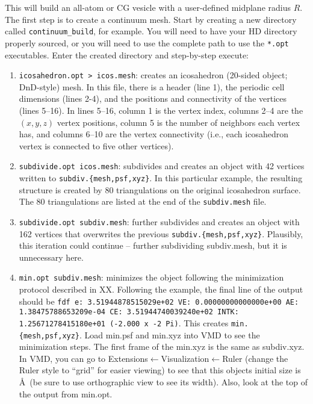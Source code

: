 This will build an all-atom or CG vesicle with a user-defined midplane radius $R$.
The first step is to create a continuum mesh.
Start by creating a new directory called \texttt{continuum_build}, for example.
You will need to have your HD directory properly sourced, or you will need to use the complete path to use the \texttt{*.opt} executables.
Enter the created directory and step-by-step execute:
\begin{enumerate}
   \item \texttt{icosahedron.opt > icos.mesh}: creates an icosahedron (20-sided object; DnD-style) mesh.
   In this file, there is a header (line 1), the periodic cell dimensions (lines 2-4), and the positions and connectivity of the vertices (lines 5--16).
   In lines 5--16, column 1 is the vertex index, columns 2--4 are the $(x,y,z)$ vertex positions, column 5 is the number of neighbors each vertex has, and columns 6--10 are the vertex connectivity (i.e., each icosahedron vertex is connected to five other vertices).
   \item \texttt{subdivide.opt icos.mesh}: subdivides and creates an object with 42 vertices written to \texttt{subdiv.\{mesh,psf,xyz\}}.
   In this particular example, the resulting structure is created by 80 triangulations on the original icosahedron surface.
   The 80 triangulations are listed at the end of the \texttt{subdiv.mesh} file.
   \item \texttt{subdivide.opt subdiv.mesh}: further subdivides and creates an object with 162 vertices that overwrites the previous \texttt{subdiv.\{mesh,psf,xyz\}}.
   Plausibly, this iteration could continue -- further subdividing subdiv.mesh, but it is unnecessary here.
   \item \texttt{min.opt subdiv.mesh}: minimizes the object following the minimization protocol described in XX.
   Following the example, the final line of the output should be \texttt{fdf e: 3.51944878515029e+02 VE: 0.00000000000000e+00 AE: 1.38475788653209e-04 CE: 3.51944740039240e+02 INTK: 1.25671278415180e+01 (-2.000 x -2 Pi)}.
   This creates \texttt{min.\{mesh,psf,xyz\}}.
   Load min.psf and min.xyz into VMD to see the minimization steps.
   The first frame of the min.xyz is the same as subdiv.xyz.
   In VMD, you can go to Extensions$\leftarrow$Visualization$\leftarrow$Ruler (change the Ruler style to ``grid'' for easier viewing) to see that this objects initial size is  \AA~(be sure to use orthographic view to see its width).
   Also, look at the top of the output from min.opt.

\end{enumerate}
